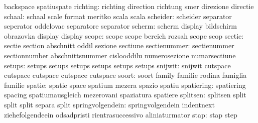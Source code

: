                            backspace                 spatiuspate %
                 richting: richting                  direction
                           richtung                  smer
                           direzione                 directie
                   schaal: schaal                    scale
                           format                    meritko
                           scala                     scala
                 scheider: scheider                  separator
                           seperator                 oddelovac
                           separatore                separator
                   scherm: scherm                    display
                           bildschirm                obrazovka
                           display                   display %
                    scope: scope                     scope
                           bereich                   rozsah
                           scope                     scop %
                   sectie: sectie                    section
                           abschnitt                 oddil
                           sezione                   sectiune
             sectienummer: sectienummer              sectionnumber
                           abschnittsnummer          cislooddilu
                           numerosezione             numarsectiune
setups: setups setups
        setups setups
        setups setups
                  snijwit: snijwit                   cutspace
                           cutspace                  cutspace
                           cutspace                  cutspace %
                    soort: soort                     family
                           familie                   rodina
                           famiglia                  familie
                   spatie: spatie                    space
                           spatium                   mezera
                           spazio                    spatiu
               spatiering: spatiering                spacing
                           spatiumausgleich          mezerovani
                           spaziatura                spatiere
                 splitsen: splitsen                  split
                           split                     split
                           separa                    split %
         springvolgendein: springvolgendein          indentnext
                           ziehefolgendeein          odsadpristi
                           rientrasuccessivo         aliniaturmator
                     stap: stap                      step

